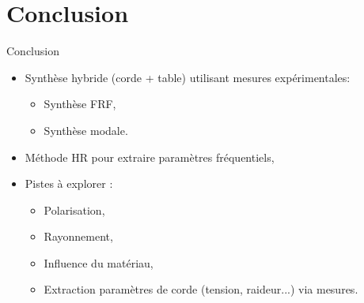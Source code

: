 \section*{Conclusion}
\begin{frame}{Conclusion}

	\begin{itemize}
    \item Synthèse hybride (corde + table) utilisant mesures expérimentales:
        \begin{itemize}
          \item Synthèse FRF,
          \item Synthèse modale.
        \end{itemize}
	  \item Méthode HR pour extraire paramètres fréquentiels,
	  \item Pistes à explorer : 
        \begin{itemize}
          \item Polarisation,
          \item Rayonnement,
          \item Influence du matériau,
          \item Extraction paramètres de corde (tension, raideur...) via mesures.
        \end{itemize}	\end{itemize}

\end{frame}
